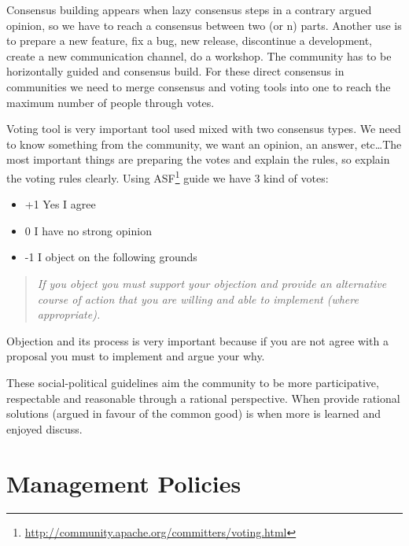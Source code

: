 \documentclass[11pt]{scrartcl}
\begin{document}
\par Consensus building appears when lazy consensus steps in a contrary argued opinion, so we have to reach a consensus between two (or n) parts. Another use is to prepare a new feature, fix a bug, new release, discontinue a development, create a new communication channel, do a workshop. The community has to be horizontally guided and consensus build. For these direct consensus in communities we need to merge consensus and voting tools into one to reach the maximum number of people through votes.

\par Voting tool is very important tool used mixed with two consensus types. We need to know something from the community, we want an opinion, an answer, etc\ldots The most important things are preparing the votes and explain the rules, so explain the voting rules clearly. Using ASF\footnote{\url{http://community.apache.org/committers/voting.html}} guide we have 3 kind of votes:

\begin{itemize}
	\item +1 Yes I agree
	\item 0 I have no strong opinion
	\item -1 I object on the following grounds
\end{itemize}

\begin{quote}
    \emph{If you object you must support your objection and provide an alternative course of action that you are willing and able to implement (where appropriate).}
\end{quote}

\par Objection and its process is very important because if you are not agree with a proposal you must to implement and argue your why.

\par These social-political guidelines aim the community to be more participative, respectable and reasonable through a rational perspective. When provide rational solutions (argued in favour of the common good) is when more is learned and enjoyed discuss.


\section{Management Policies}
\label{sec:management-policies}
\end{document}
